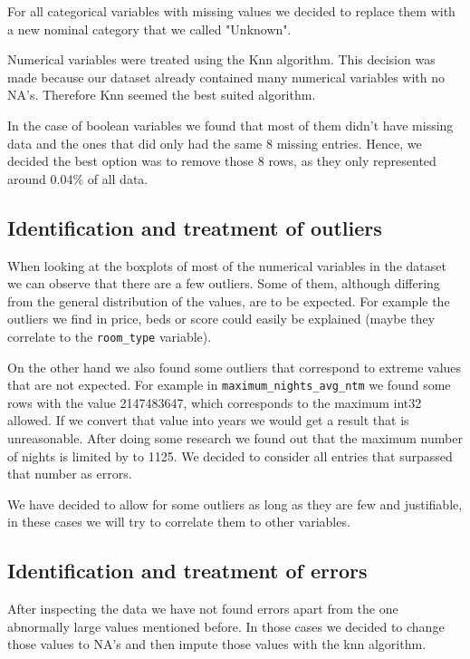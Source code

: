 For all categorical variables with missing values we decided to
replace them with a new nominal category that we called "Unknown".

Numerical variables were treated using the Knn algorithm. This decision
was made because our dataset already contained many numerical variables
with no NA's. Therefore Knn seemed the best suited algorithm.

In the case of boolean variables we found that most of them didn't have
missing data and the ones that did only had the same 8 missing entries.
Hence, we decided the best option was to remove those 8 rows, as they
only represented around 0.04\% of all data.

\pagebreak
\subsection{Identification and treatment of outliers}

When looking at the boxplots of most of the numerical variables in the dataset
we can observe that there are a few outliers. Some of them, although differing
from the general distribution of the values, are to be expected. For example the
outliers we find in price, beds or score could easily be explained (maybe they
correlate to the \texttt{room\_type} variable).

On the other hand we also found some outliers that correspond to extreme values
that are not expected. For example in \texttt{maximum\_nights\_avg\_ntm} we
found some rows with the value 2147483647, which corresponds to the maximum
int32 allowed. If we convert that value into years we would get a result that is
unreasonable. After doing some research we found out that the maximum number of nights is limited by \airbnb to 1125. We decided to consider all entries that surpassed that number as errors.

We have decided to allow for some outliers as long as they are few and
justifiable, in these cases we will try to correlate them to other variables.

\subsection{Identification and treatment of errors}

After inspecting the data we have not found errors apart from the one abnormally
large values mentioned before. In those cases we decided to change those values to NA's and then impute those values with the knn algorithm.

